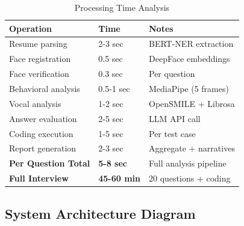 \documentclass[12pt,a4paper]{article}
\begin{document}
\begin{table}[h!]
\centering
\begin{tabular}{|l|l|l|}
\hline
\textbf{Operation} & \textbf{Time} & \textbf{Notes} \\
\hline
Resume parsing & 2-3 sec & BERT-NER extraction \\
Face registration & 0.5 sec & DeepFace embeddings \\
Face verification & 0.3 sec & Per question \\
Behavioral analysis & 0.5-1 sec & MediaPipe (5 frames) \\
Vocal analysis & 1-2 sec & OpenSMILE + Librosa \\
Answer evaluation & 2-5 sec & LLM API call \\
Coding execution & 1-5 sec & Per test case \\
Report generation & 2-3 sec & Aggregate + narratives \\
\hline
\textbf{Per Question Total} & \textbf{5-8 sec} & Full analysis pipeline \\
\textbf{Full Interview} & \textbf{45-60 min} & 20 questions + coding \\
\hline
\end{tabular}
\caption{Processing Time Analysis}
\end{table}

\newpage

\subsection{System Architecture Diagram}
\end{document}
